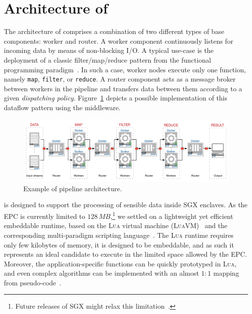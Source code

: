 \section{Architecture of \SYS}\label{sec:architecture}
The architecture of \SYS{} comprises a combination of two different types of base components: \textsf{worker} and \textsf{router}.
A \textsf{worker} component continuously listens for incoming data by means of non-blocking I/O.
A typical use-case is the deployment of a classic filter/map/reduce pattern from the functional programming paradigm~\cite{bird_introduction_1988}.
In such a case, worker nodes execute only one function, namely \texttt{map}, \texttt{filter}, or \texttt{reduce}.
A \textsf{router} component acts as a message broker between workers in the pipeline and transfers data between them according to a given \emph{dispatching policy}.
Figure~\ref{fig:architecture_pipeline} depicts a possible implementation of this dataflow pattern using the \SYS{} middleware.
% 
\begin{figure}[!t]
  \centering
  \includegraphics[width=.9\linewidth]{figures/architecture_pipeline}
  \caption{Example of \SYS{} pipeline architecture.}
  \label{fig:architecture_pipeline}
\end{figure}
% 
\SYS{} is designed to support the processing of sensible data inside SGX enclaves.
As the EPC is currently limited to $128\,MB$,\footnote{Future releases of SGX might relax this limitation~\cite{mckeen2016intel}.} we settled on a lightweight yet efficient embeddable runtime, based on the \textsc{Lua} virtual machine (\textsc{LuaVM})~\cite{ierusalimschy_luaextensible_1996} and the corresponding multi-paradigm scripting language~\cite{lualang}.
The \textsc{Lua} runtime requires only few kilobytes of memory, it is designed to be embeddable, and as such it represents an ideal candidate to execute in the limited space allowed by the EPC.
Moreover, the application-specific functions can be quickly prototyped in \textsc{Lua}, and even complex algorithms can be implemented with an almost $1:1$ mapping from pseudo-code~\cite{leonini2009splay}.
